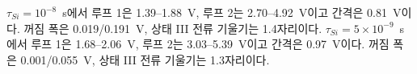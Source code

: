 $\tau_{Si}=10^{-8}$~s에서 루프 1은 1.39--1.88~V, 루프 2는 2.70--4.92~V이고 간격은 0.81~V이다. 꺼짐 폭은 0.019/0.191~V, 상태 III 전류 기울기는 1.4자리이다. $\tau_{Si}=5\times10^{-9}$~s에서 루프 1은 1.68--2.06~V, 루프 2는 3.03--5.39~V이고 간격은 0.97~V이다. 꺼짐 폭은 0.001/0.055~V, 상태 III 전류 기울기는 1.3자리이다.
